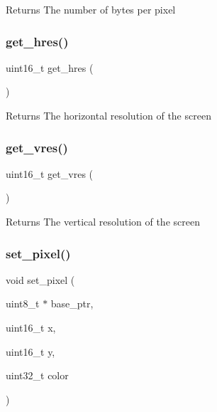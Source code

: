 \begin{DoxyReturn}{Returns}
The number of bytes per pixel 
\end{DoxyReturn}
\mbox{\label{group__video__card_ga8becb86f48f701c43e1c411f57f60c4d}} 
\subsubsection{\texorpdfstring{get\+\_\+hres()}{get\_hres()}}
{\footnotesize\ttfamily uint16\+\_\+t get\+\_\+hres (\begin{DoxyParamCaption}{ }\end{DoxyParamCaption})}

\begin{DoxyReturn}{Returns}
The horizontal resolution of the screen 
\end{DoxyReturn}
\mbox{\label{group__video__card_gad5999dee7ae30ea14b13e2e2e5a92c88}} 
\subsubsection{\texorpdfstring{get\+\_\+vres()}{get\_vres()}}
{\footnotesize\ttfamily uint16\+\_\+t get\+\_\+vres (\begin{DoxyParamCaption}{ }\end{DoxyParamCaption})}

\begin{DoxyReturn}{Returns}
The vertical resolution of the screen 
\end{DoxyReturn}
\mbox{\label{group__video__card_ga5f6f4feebf127c7d02258175e5df35ff}} 
\subsubsection{\texorpdfstring{set\+\_\+pixel()}{set\_pixel()}}
{\footnotesize\ttfamily void set\+\_\+pixel (\begin{DoxyParamCaption}\item[{uint8\+\_\+t $\ast$}]{base\+\_\+ptr,  }\item[{uint16\+\_\+t}]{x,  }\item[{uint16\+\_\+t}]{y,  }\item[{uint32\+\_\+t}]{color }\end{DoxyParamCaption})}



